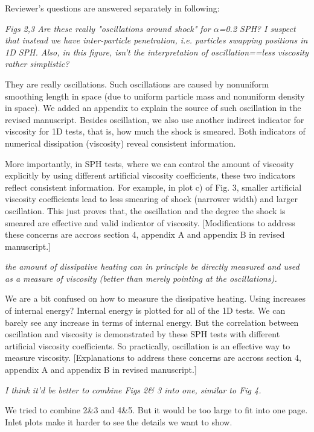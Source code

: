 \documentclass[10pt,a4paper]{article}
\begin{document}
Reviewer's questions are answered separately in following: 

\textit{Figs 2,3 Are these really "oscillations around shock" for $\alpha$=0.2 SPH? I suspect that instead we have inter-particle penetration, i.e.
particles swapping positions in 1D SPH. Also, in this figure, isn't the interpretation of oscillation==less viscosity rather simplistic? }

They are really oscillations. Such oscillations are caused by nonuniform smoothing length in space (due to uniform particle mass and nonuniform density in space). We added an appendix to explain the source of such oscillation in the revised manuscript.
Besides oscillation, we also use another indirect indicator for viscosity for 1D tests, that is, how much the shock is smeared. Both indicators of numerical dissipation (viscosity) reveal consistent information. 

More importantly, in SPH tests, where we can control the amount of viscosity explicitly by using different artificial viscosity coefficients, these two indicators reflect consistent information. For example, in plot c) of Fig. 3, smaller artificial viscosity coefficients lead to less smearing of shock (narrower width) and larger oscillation. This just proves that, the oscillation and the degree the shock is smeared are effective and valid indicator of viscosity.
[Modifications to address these concerns are accross section 4, appendix A and appendix B in revised manuscript.]

\textit{the amount of dissipative heating can in principle be directly measured and used as a measure of viscosity (better than merely pointing at the oscillations).}  

We are a bit confused on how to measure the dissipative heating. Using increases of internal energy? Internal energy is plotted for all of the 1D tests. We can barely see any increase in terms of internal energy. But the correlation between oscillation and viscosity is demonstrated by these SPH tests with different artificial viscosity coefficients. So practically, oscillation is an effective way to measure viscosity.
[Explanations to address these concerns are accross section 4, appendix A and appendix B in revised manuscript.]

\textit{I think it'd be better to combine Figs 2\& 3 into one, similar to Fig 4.}

We tried to combine 2\&3 and 4\&5. But it would be too large to fit into one page. Inlet plots make it harder to see the details we want to show.
\end{document}
